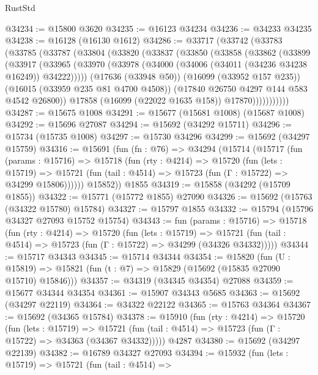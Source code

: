 \begin{lexlean}{RustStd}
\begin{coremodule}
@34234 := @15800 @3620
@34235 := @16123 @34234
@34236 := @34233 @34235
@34238 := @16128 (@16130 @1612)
@34286 := @33717
    (@33742
      (@33783
        (@33785
          (@33787
            (@33804
              (@33820
                (@33837
                  (@33850
                    (@33858
                      (@33862
                        (@33899
                          (@33917
                            (@33965
                              (@33970
                                (@33978 (@34000 (@34006 (@34011 (@34236 @34238 @16249)) @34222)))))
                            (@17636 (@33948 @50))
                            (@16099 (@33952 @157 @235))
                            (@16015 (@33959 @235 @81 @4700 @4508))
                            (@17840 @26750 @4297 @144 @583 @4542 @26800))
                          @17858
                          (@16099 (@22022 @1635 @158))
                          @17870)))))))))))
@34287 := @15675 @1008
@34291 := @15677 (@15681 @1008) (@15687 @1008)
@34292 := @15696 @27087
@34294 := @15692 (@34292 @15711)
@34296 := @15734 (@15735 @1008)
@34297 := @15730 @34296
@34299 := @15692 (@34297 @15759)
@34316 := @15691
    (fun (fn : @76) =>
    @34294
      (@15714
        (@15717
          (fun (params : @15716) =>
          @15718
            (fun (rty : @4214) =>
            @15720
              (fun (lets : @15719) =>
              @15721 (fun (tail : @4514) => @15723 (fun (Γ : @15722) => @34299 @15806))))))
        @15852))
    @1855
@34319 := @15858 (@34292 (@15709 @1855))
@34322 := @15771 (@15772 @1855) @27090
@34326 := @15692 (@15763 (@34322 @15780) @15784)
@34327 := @15797 @1855
@34332 := @15794 (@15796 @34327 @27093 @15752 @15754)
@34343 := fun (params : @15716) =>
  @15718
    (fun (rty : @4214) =>
    @15720
      (fun (lets : @15719) =>
      @15721 (fun (tail : @4514) => @15723 (fun (Γ : @15722) => @34299 (@34326 @34332)))))
@34344 := @15717 @34343
@34345 := @15714 @34344
@34354 := @15820
    (fun (U : @15819) => @15821 (fun (t : @7) => @15829 (@15692 (@15835 @27090 @15710) @15846)))
@34357 := @34319 (@34345 @34354) @27088
@34359 := @15677 @34344 @34354
@34361 := @15907 @34343 @5685
@34363 := @15692 (@34297 @22119)
@34364 := @34322 @22122
@34365 := @15763 @34364
@34367 := @15692 (@34365 @15784)
@34378 := @15910
    (fun (rty : @4214) =>
    @15720
      (fun (lets : @15719) =>
      @15721 (fun (tail : @4514) => @15723 (fun (Γ : @15722) => @34363 (@34367 @34332)))))
    @4287
@34380 := @15692 (@34297 @22139)
@34382 := @16789 @34327 @27093
@34394 := @15932
    (fun (lets : @15719) =>
    @15721
      (fun (tail : @4514) =>

\end{coremodule}
\end{lexlean}
